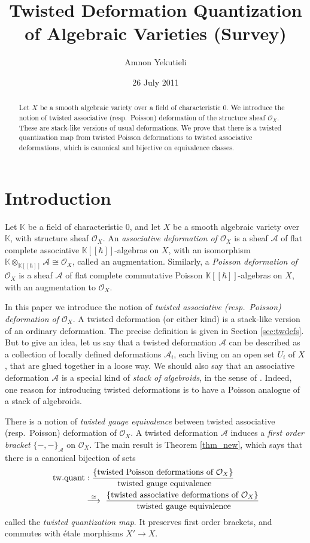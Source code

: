 \documentclass{conm-p-l}
\date{26 July 2011}
\title[Twisted Deformation Quantization]{Twisted Deformation
Quantization of Algebraic Varieties (Survey)}
\author{Amnon Yekutieli}
\theoremstyle{definition}
\numberwithin{equation}{section}
\newcommand{\iso}{\stackrel{\simeq}{\longrightarrow}}
\newcommand{\opn}{\operatorname}
\newcommand{\mcal}[1]{\mathcal{#1}}
\newcommand{\mbb}[1]{\mathbb{#1}}
\newcommand{\tup}[1]{\textup{#1}}
\newcommand{\bsym}[1]{\boldsymbol{#1}}
\newcommand{\K}{\mbb{K}}
\newcommand{\gerbe}[1]{\bsym{\mcal{#1}}}
\begin{document}
\begin{abstract}
Let $X$ be a smooth algebraic variety over a field of characteristic
$0$. We introduce the notion of twisted associative (resp.\
Poisson) deformation of the structure sheaf $\mcal{O}_X$. These are
stack-like versions of usual deformations. We prove that there is a
twisted quantization map from twisted Poisson deformations
to twisted associative deformations, which is canonical and bijective
on equivalence classes.
\end{abstract}

\maketitle

\setcounter{section}{-1}
\section{Introduction}
\label{sec:Int}

Let $\K$ be a field of characteristic $0$, and let $X$ be a
smooth algebraic variety over $\K$, with structure sheaf
$\mcal{O}_X$. An {\em associative deformation of $\mcal{O}_X$} is a
sheaf $\mcal{A}$ of flat complete associative $\K[[\hbar]]$-algebras on $X$,
with an isomorphism $\K \otimes_{\K[[\hbar]]} \mcal{A} \cong \mcal{O}_X$, called
an augmentation. Similarly, a {\em Poisson deformation of $\mcal{O}_X$} is a
sheaf $\mcal{A}$ of flat complete commutative Poisson $\K[[\hbar]]$-algebras
on $X$, with an augmentation to $\mcal{O}_X$. 

In this paper we introduce the notion of {\em twisted associative
\tup{(}resp.\ Poisson\tup{)} deformation of $\mcal{O}_X$}.  
A twisted deformation (or either kind) is a stack-like version of an
ordinary deformation. The precise definition is given in Section 
\ref{sec:twdefs}. But to give an idea, let us say that a twisted deformation 
$\gerbe{A}$ can be described as a collection of locally defined
deformations $\mcal{A}_i$, each living on an open set $U_i$ of $X$, that
are glued together in a loose way. We should also say that an
associative deformation $\gerbe{A}$ is a special kind of
{\em stack of algebroids}, in the sense of \cite{Ko2}.
Indeed, one reason for introducing twisted deformations is to have a
Poisson analogue of a stack of algebroids.

There is a notion of {\em twisted gauge equivalence} between  
twisted associative (resp.\ Poisson) deformation of
$\mcal{O}_X$. A twisted deformation $\gerbe{A}$ induces a {\em
first order bracket} $\{ -,- \}_{\gerbe{A}}$ on $\mcal{O}_X$.
The main result is Theorem \ref{thm_new}, which says that 
there is a canonical bijection of sets
\[ \begin{aligned}
& \opn{tw{.}quant} : 
\frac{ \{ \tup{twisted Poisson deformations of 
$\mcal{O}_X$} \} }
{\tup{ twisted gauge equivalence}} \\
& \qquad \qquad \iso \
\frac{ \{ \tup{twisted associative deformations of 
$\mcal{O}_X$} \} }
{\tup{ twisted gauge equivalence}}
\end{aligned} \] 
called the {\em twisted quantization map}. 
It preserves first order brackets, and commutes with \'etale morphisms 
$X' \to X$.
\end{document}
